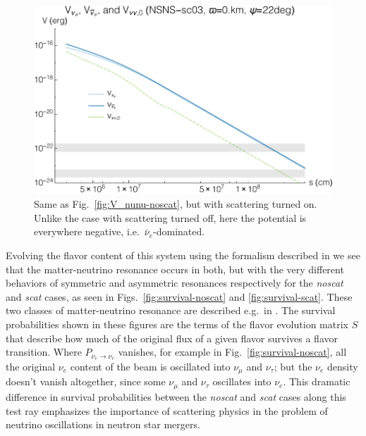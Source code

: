 \documentclass[aps,floatfix,prd,superscriptaddress,twocolumn]{revtex4-1}
\begin{document}
\begin{figure}
  \includegraphics[width=\columnwidth]{20170619-potentials-Vnue_Vnua_Vnu-000Mo-022deg-scat}
  \caption{Same as Fig.~\ref{fig:V_nunu-noscat},
    but with scattering turned on.
    Unlike the case with scattering turned off, here the potential is
    everywhere negative, i.e.\ $\bar{\nu}_e$-dominated.
    }
  \label{fig:V_nunu-scat}
\end{figure}

Evolving the flavor content of this system using the formalism described in
\cite{zhu2016-mnr_nsns_remnant}
we see that the matter-neutrino resonance occurs in both,
but with the very different behaviors of symmetric and asymmetric
resonances respectively for the \emph{noscat} and \emph{scat} cases,
as seen in Figs.~\ref{fig:survival-noscat} and \ref{fig:survival-scat}.
These two classes of matter-neutrino resonance
are described e.g.\ in \cite{malk2016-mnr_3,vaan2016-uncovering_mnr}.
The survival probabilities shown in these figures are the terms of
the flavor evolution matrix $S$ that describe how much of the original flux
of a given flavor survives a flavor transition.
Where $P_{\nu_e\rightarrow\nu_e}$ vanishes, for example in
Fig.~\ref{fig:survival-noscat}, all the original $\nu_e$ content of the beam
is oscillated into $\nu_\mu$ and $\nu_\tau$; but the $\nu_e$ density doesn't
vanish altogether,
since some $\nu_\mu$ and $\nu_\tau$ oscillates into $\nu_e$.
This dramatic difference in survival probabilities between the \emph{noscat}
and \emph{scat} cases along this test ray emphasizes the importance of
scattering physics in the problem of neutrino oscillations in
neutron star mergers.
\end{document}
